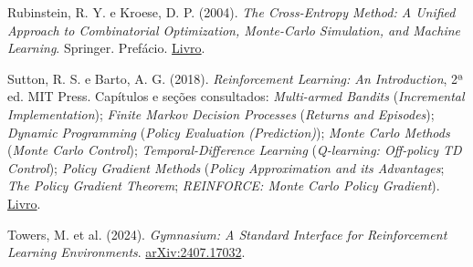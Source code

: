 \documentclass[12pt]{article}
\begin{document}
\noindent Rubinstein, R. Y. e Kroese, D. P. (2004). \emph{The Cross-Entropy Method: A Unified Approach to Combinatorial Optimization, Monte-Carlo Simulation, and Machine Learning}. Springer. Prefácio. \href{https://doi.org/10.1007/978-1-4757-4321-0}{Livro}.\par\smallskip

\noindent Sutton, R. S. e Barto, A. G. (2018). \emph{Reinforcement Learning: An Introduction}, 2ª ed. MIT Press. Capítulos e seções consultados: \emph{Multi-armed Bandits} (\emph{Incremental Implementation}); \emph{Finite Markov Decision Processes} (\emph{Returns and Episodes}); \emph{Dynamic Programming} (\emph{Policy Evaluation (Prediction)}); \emph{Monte Carlo Methods} (\emph{Monte Carlo Control}); \emph{Temporal-Difference Learning} (\emph{Q-learning: Off-policy TD Control}); \emph{Policy Gradient Methods} (\emph{Policy Approximation and its Advantages}; \emph{The Policy Gradient Theorem}; \emph{REINFORCE: Monte Carlo Policy Gradient}). \href{http://incompleteideas.net/book/the-book-2nd.html}{Livro}.\par\smallskip


\noindent Towers, M. et al. (2024). \emph{Gymnasium: A Standard Interface for Reinforcement Learning Environments}. \href{https://arxiv.org/abs/2407.17032}{arXiv:2407.17032}.\par\smallskip
\end{document}
